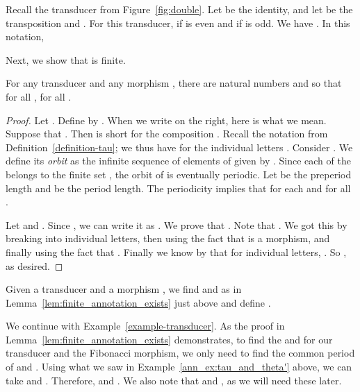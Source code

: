\begin{example}\label{ann_ex:tau_and_theta'}
  Recall the transducer  from Figure~\ref{fig:double}. Let  be the identity, 
  and let  be the transposition  and . 
  For this transducer, 
   if   is even and  if   is odd.
We have .
  In this notation,
  
\end{example}

Next, we show that  is finite.

\begin{lemma}\label{lem:finite_annotation_exists}
  For any  transducer  and any morphism ,  
  there are natural numbers  and  so that for all , 
   for all .
\end{lemma}

\begin{proof}
  Let . Define  by 
  .
When we write  on the right, here is what we mean.  Suppose that .
  Then  is short for the composition .
  Recall the notation  from Definition~\ref{definition-tau}; we thus have  for  the individual letters .
  Consider .   We define its \emph{orbit} as 
  the infinite sequence  of elements of  given by
  .
Since each of the  belongs to the finite set ,  the orbit of  is eventually periodic. 
  Let  be the preperiod length and  be the period length. The
  periodicity implies that   for each  and for all .


  Let  and . Since , we can write it as .
  We prove that 
  . 
  Note that
  .
We got this  by breaking  into individual letters, then using the fact that  is a morphism, and finally using 
  the fact that .
  Finally we know by  that for individual letters,
  .
  So  , as desired.
\end{proof}

\begin{definition}[]
  Given a  transducer  and a morphism , we find  and  as in Lemma~\ref{lem:finite_annotation_exists}
  just above and define .
\label{def-Theta}
\end{definition}

\begin{example}  We continue with Example~\ref{example-transducer}.
  As the proof in Lemma~\ref{lem:finite_annotation_exists} demonstrates, to find the  and  for our transducer and the
   Fibonacci morphism, we only need to  find the common period of   and .
Using what we saw in Example~\ref{ann_ex:tau_and_theta'} above,  we can  take  and . 
  Therefore,  and . 
  We also note that  and , as we will need these later.
\end{example}

